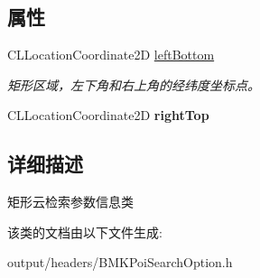 \subsection*{属性}
\begin{DoxyCompactItemize}
\item 
\hypertarget{interface_b_m_k_bound_search_option_ad68044c4ded82d49551ea014f20e5b67}{}C\+L\+Location\+Coordinate2\+D \hyperlink{interface_b_m_k_bound_search_option_ad68044c4ded82d49551ea014f20e5b67}{left\+Bottom}\label{interface_b_m_k_bound_search_option_ad68044c4ded82d49551ea014f20e5b67}

\begin{DoxyCompactList}\small\item\em 矩形区域，左下角和右上角的经纬度坐标点。 \end{DoxyCompactList}\item 
\hypertarget{interface_b_m_k_bound_search_option_a6864fdcb6ad4d284a17a31d76a4e54f8}{}C\+L\+Location\+Coordinate2\+D {\bfseries right\+Top}\label{interface_b_m_k_bound_search_option_a6864fdcb6ad4d284a17a31d76a4e54f8}

\end{DoxyCompactItemize}


\subsection{详细描述}
矩形云检索参数信息类 

该类的文档由以下文件生成\+:\begin{DoxyCompactItemize}
\item 
output/headers/B\+M\+K\+Poi\+Search\+Option.\+h\end{DoxyCompactItemize}
